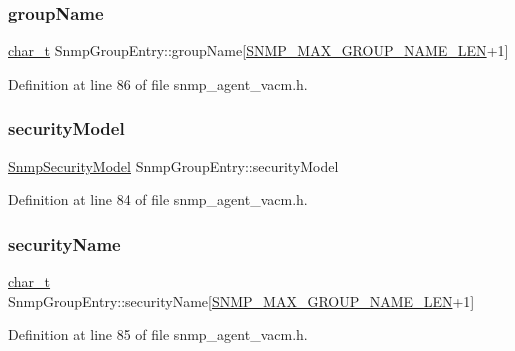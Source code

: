 \subsubsection{\texorpdfstring{group\+Name}{groupName}}
{\footnotesize\ttfamily \hyperlink{compiler__port_8h_a40bb5262bf908c328fbcfbe5d29d0201}{char\+\_\+t} Snmp\+Group\+Entry\+::group\+Name\mbox{[}\hyperlink{snmp__common_8h_a0810d82091ca56abdd23f86a04944c32}{S\+N\+M\+P\+\_\+\+M\+A\+X\+\_\+\+G\+R\+O\+U\+P\+\_\+\+N\+A\+M\+E\+\_\+\+L\+EN}+1\mbox{]}}



Definition at line 86 of file snmp\+\_\+agent\+\_\+vacm.\+h.

\mbox{\label{structSnmpGroupEntry_a49d7c30c44a6ee54b7febef1e0fe2e2f}} 
\subsubsection{\texorpdfstring{security\+Model}{securityModel}}
{\footnotesize\ttfamily \hyperlink{snmp__agent__usm_8h_a59354ab45890b9da1b27d44f88193695}{Snmp\+Security\+Model} Snmp\+Group\+Entry\+::security\+Model}



Definition at line 84 of file snmp\+\_\+agent\+\_\+vacm.\+h.

\mbox{\label{structSnmpGroupEntry_a5e747f5e2226fd1e218689b5bac75344}} 
\subsubsection{\texorpdfstring{security\+Name}{securityName}}
{\footnotesize\ttfamily \hyperlink{compiler__port_8h_a40bb5262bf908c328fbcfbe5d29d0201}{char\+\_\+t} Snmp\+Group\+Entry\+::security\+Name\mbox{[}\hyperlink{snmp__common_8h_a0810d82091ca56abdd23f86a04944c32}{S\+N\+M\+P\+\_\+\+M\+A\+X\+\_\+\+G\+R\+O\+U\+P\+\_\+\+N\+A\+M\+E\+\_\+\+L\+EN}+1\mbox{]}}



Definition at line 85 of file snmp\+\_\+agent\+\_\+vacm.\+h.

\mbox{\label{structSnmpGroupEntry_a4ef2232ee93ed76fc09656ca669db373}} 
